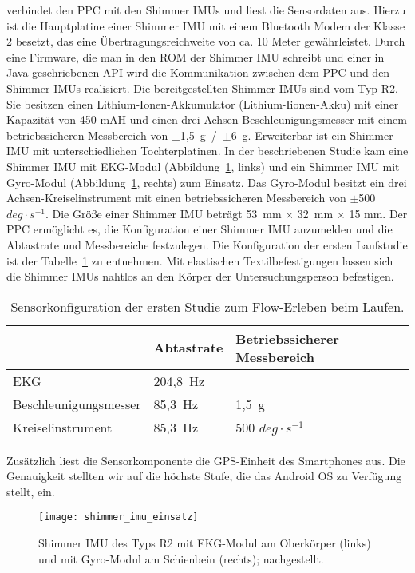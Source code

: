 \label{par:die_sensorkomponente}

verbindet den \ac{PPC} mit den Shimmer \acp{IMU} und liest die Sensordaten aus. Hierzu ist die Hauptplatine einer Shimmer \ac{IMU} mit einem Bluetooth Modem der Klasse 2 besetzt, das eine Übertragungsreichweite von ca. 10 Meter gewährleistet. Durch eine Firmware, die man in den \acs{ROM} der Shimmer \ac{IMU} schreibt und einer in Java geschriebenen \acs{API} wird die Kommunikation zwischen dem \ac{PPC} und den Shimmer \acp{IMU} realisiert. Die bereitgestellten Shimmer \acp{IMU} sind vom Typ R2. Sie besitzen einen Lithium-Ionen-Akkumulator (Lithium-Iionen-Akku) mit einer Kapazität von 450 mAH und einen drei Achsen-Beschleunigungsmesser mit einem betriebssicheren Messbereich von \mbox{$\pm$1,5~g / $\pm$6 g}. Erweiterbar ist ein Shimmer \ac{IMU} mit unterschiedlichen Tochterplatinen. In der beschriebenen Studie kam eine Shimmer \ac{IMU} mit \ac{EKG}-Modul (Abbildung~\ref{fig:shimmer_imu_einsatz}, links) und ein Shimmer \ac{IMU} mit Gyro-Modul (Abbildung~\ref{fig:shimmer_imu_einsatz}, rechts) zum Einsatz. Das Gyro-Modul besitzt ein drei Achsen-Kreiselinstrument mit einen betriebssicheren Messbereich von \mbox{$\pm$500 $deg \cdot s^{-1}$}. Die Größe einer Shimmer \ac{IMU} beträgt 53~mm $\times$ 32~mm $\times$ 15 mm. Der \ac{PPC} ermöglicht es, die Konfiguration einer Shimmer \ac{IMU} anzumelden und die Abtastrate und Messbereiche festzulegen. Die Konfiguration der ersten Laufstudie ist der Tabelle~\ref{tab:sensorkonfiguration_1} zu entnehmen. Mit elastischen Textilbefestigungen lassen sich die Shimmer \acp{IMU} nahtlos an den Körper der Untersuchungsperson befestigen. 
\begin{table}
	[!htb] \caption[Sensorkonfiguration (Erste Studie: Laufen)]{Sensorkonfiguration der ersten Studie zum Flow-Erleben beim Laufen.} \label{tab:sensorkonfiguration_1} 
	\begin{tabularx}
		{ 
		\textwidth}{p{} p{} p{}} \toprule & Abtastrate & Betriebssicherer Messbereich \\
		\midrule \ac{EKG} & 204,8~Hz & \\
		Beschleunigungsmesser & 85,3~Hz & 1,5~g \\
		Kreiselinstrument & 85,3~Hz & 500 $deg \cdot s^{-1}$ \\
		\bottomrule 
	\end{tabularx}
\end{table}

Zusätzlich liest die Sensorkomponente die \acs{GPS}-Einheit des Smartphones aus. Die Genauigkeit stellten wir auf die höchste Stufe, die das Android OS zu Verfügung stellt, ein. 
\begin{figure}
	[!htb] \centering 
	\texttt{[image: shimmer\_imu\_einsatz]} \caption[Shimmer \acs{IMU}s mit Modulen]{Shimmer \acs{IMU} des Typs R2 mit \ac{EKG}-Modul am Oberkörper (links) und mit Gyro-Modul am Schienbein (rechts); nachgestellt.} \label{fig:shimmer_imu_einsatz} 
\end{figure}

